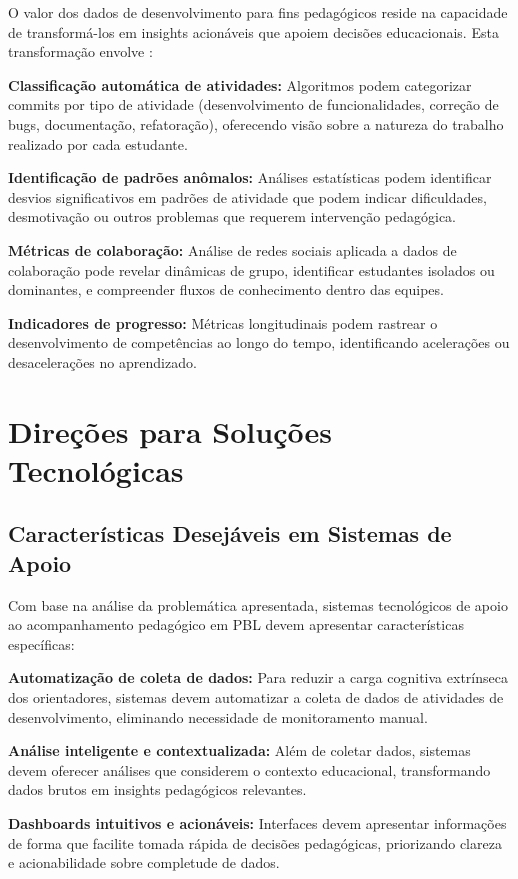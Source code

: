 \documentclass[english, spanish, brazilian]{RBIEarticle} %
\begin{document}
O valor dos dados de desenvolvimento para fins pedagógicos reside na capacidade de transformá-los em insights acionáveis que apoiem decisões educacionais. Esta transformação envolve \cite{Seffrin2013}:

\textbf{Classificação automática de atividades:} Algoritmos podem categorizar commits por tipo de atividade (desenvolvimento de funcionalidades, correção de bugs, documentação, refatoração), oferecendo visão sobre a natureza do trabalho realizado por cada estudante.

\textbf{Identificação de padrões anômalos:} Análises estatísticas podem identificar desvios significativos em padrões de atividade que podem indicar dificuldades, desmotivação ou outros problemas que requerem intervenção pedagógica.

\textbf{Métricas de colaboração:} Análise de redes sociais aplicada a dados de colaboração pode revelar dinâmicas de grupo, identificar estudantes isolados ou dominantes, e compreender fluxos de conhecimento dentro das equipes.

\textbf{Indicadores de progresso:} Métricas longitudinais podem rastrear o desenvolvimento de competências ao longo do tempo, identificando acelerações ou desacelerações no aprendizado.

\section{Direções para Soluções Tecnológicas}

\subsection{Características Desejáveis em Sistemas de Apoio}

Com base na análise da problemática apresentada, sistemas tecnológicos de apoio ao acompanhamento pedagógico em PBL devem apresentar características específicas:

\textbf{Automatização de coleta de dados:} Para reduzir a carga cognitiva extrínseca dos orientadores, sistemas devem automatizar a coleta de dados de atividades de desenvolvimento, eliminando necessidade de monitoramento manual.

\textbf{Análise inteligente e contextualizada:} Além de coletar dados, sistemas devem oferecer análises que considerem o contexto educacional, transformando dados brutos em insights pedagógicos relevantes.

\textbf{Dashboards intuitivos e acionáveis:} Interfaces devem apresentar informações de forma que facilite tomada rápida de decisões pedagógicas, priorizando clareza e acionabilidade sobre completude de dados.
\end{document}
